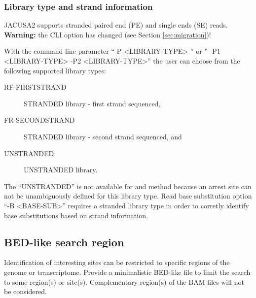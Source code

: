 \documentclass[10pt,a4paper]{article} \usepackage[utf8]{inputenc}
\begin{document}
\subsubsection{Library type and strand information}
JACUSA2 supports stranded paired end (PE) and single ends (SE) reads. \textbf{Warning:} the CLI option
has changed (see Section \ref{sec:migration})!

With the command line parameter ``-P <LIBRARY-TYPE> '' or '' -P1 <LIBRARY-TYPE> -P2 <LIBRARY-TYPE>''
the user can choose from the following supported library types:
\begin{description} 
\item[RF-FIRSTSTRAND] STRANDED library - first strand sequenced,
\item[FR-SECONDSTRAND] STRANDED library - second strand sequenced, and
\item[UNSTRANDED] UNSTRANDED library.
\end{description}
The ``UNSTRANDED'' is not available for \rtarrest and \lrtarrest method because an arrest site can
not be unambiguously defined for this library type. Read base substitution option ``-B <BASE-SUB>''
requires a stranded library type in order to corretly identify base substitutions based on strand 
information.
\subsection{BED-like search region}
Identification of interesting sites can be restricted to specific regions of the genome or transcriptome.
Provide a minimalistic BED-like file to limit the search to some region(s) or site(s). 
Complementary region(s) of the BAM files will not be considered.
\end{document}
